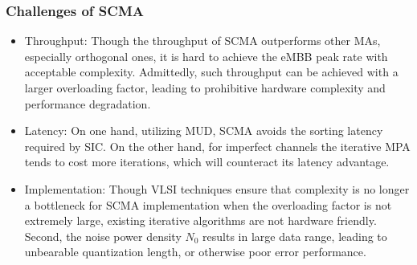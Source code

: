 \documentclass[journal,twoside]{IEEEtran}
\begin{document}

\subsubsection{Challenges of SCMA}
\begin{itemize}
  \item Throughput: Though the throughput of SCMA outperforms other MAs, especially orthogonal ones, it is hard to achieve the eMBB peak rate with acceptable complexity. Admittedly, such throughput can be achieved with a larger overloading factor, leading to prohibitive hardware complexity and performance degradation.
  \item Latency: On one hand, utilizing MUD, SCMA avoids the sorting latency required by SIC. On the other hand, for imperfect channels the iterative MPA tends to cost more iterations, which will counteract its latency advantage.
  \item Implementation: Though VLSI techniques ensure that complexity is no longer a bottleneck for SCMA implementation when the overloading factor is not extremely large, existing iterative algorithms are not hardware friendly. Second, the noise power density $N_0$ results in large data range, leading to unbearable quantization length, or otherwise poor error performance.
\end{itemize}
\end{document}
